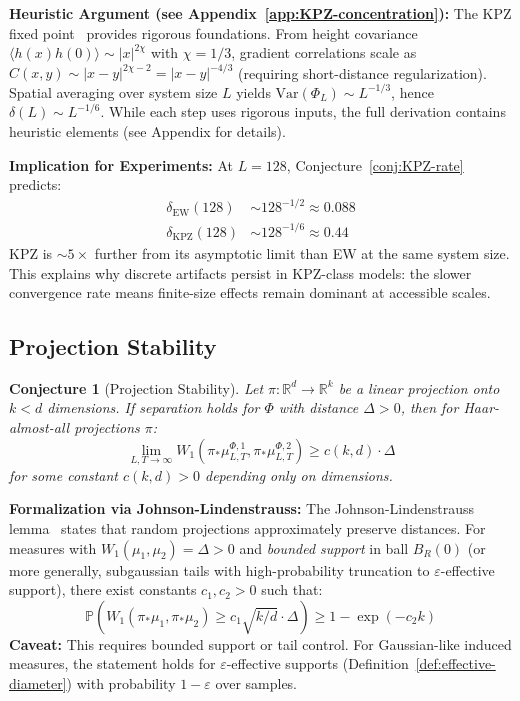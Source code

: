 \documentclass[aps,pre,reprint,amsmath,amssymb,superscriptaddress]{revtex4-2}
\newtheorem{conjecture}{Conjecture}
\newcommand{\EW}{\text{EW}}
\newcommand{\KPZ}{\text{KPZ}}
\newcommand{\bbP}{\mathbb{P}}
\newcommand{\bbR}{\mathbb{R}}
\begin{document}
\textbf{Heuristic Argument (see Appendix~\ref{app:KPZ-concentration}):} The KPZ fixed point~\cite{MQR2021} provides rigorous foundations. From height covariance $\langle h(x)h(0)\rangle \sim |x|^{2\chi}$ with $\chi=1/3$, gradient correlations scale as $C(x,y) \sim |x-y|^{2\chi-2} = |x-y|^{-4/3}$ (requiring short-distance regularization). Spatial averaging over system size $L$ yields $\text{Var}(\Phi_L) \sim L^{-1/3}$, hence $\delta(L) \sim L^{-1/6}$. While each step uses rigorous inputs, the full derivation contains heuristic elements (see Appendix for details).

\textbf{Implication for Experiments:} At $L = 128$, Conjecture~\ref{conj:KPZ-rate} predicts:
\begin{align}
\delta_{\EW}(128) &\sim 128^{-1/2} \approx 0.088 \\
\delta_{\KPZ}(128) &\sim 128^{-1/6} \approx 0.44
\end{align}
KPZ is $\sim 5\times$ further from its asymptotic limit than EW at the same system size. This explains why discrete artifacts persist in KPZ-class models: the slower convergence rate means finite-size effects remain dominant at accessible scales.

\subsection{Projection Stability}

\begin{conjecture}[Projection Stability]
\label{conj:projection}
Let $\pi: \bbR^d \to \bbR^k$ be a linear projection onto $k < d$ dimensions. If separation holds for $\Phi$ with distance $\Delta > 0$, then for Haar-almost-all projections $\pi$:
\begin{equation}
\lim_{L,T\to\infty} W_1(\pi_* \mu^{\Phi,1}_{L,T}, \pi_* \mu^{\Phi,2}_{L,T}) \geq c(k,d) \cdot \Delta
\end{equation}
for some constant $c(k,d) > 0$ depending only on dimensions.
\end{conjecture}

\textbf{Formalization via Johnson-Lindenstrauss:} The Johnson-Lindenstrauss lemma~\cite{JohnsonLindenstrauss1984} states that random projections approximately preserve distances. For measures with $W_1(\mu_1, \mu_2) = \Delta > 0$ and \emph{bounded support} in ball $B_R(0)$ (or more generally, subgaussian tails with high-probability truncation to $\varepsilon$-effective support), there exist constants $c_1, c_2 > 0$ such that:
\begin{equation}
\bbP\left(W_1(\pi_* \mu_1, \pi_* \mu_2) \geq c_1 \sqrt{k/d} \cdot \Delta\right) \geq 1 - \exp(-c_2 k)
\end{equation}
\textbf{Caveat:} This requires bounded support or tail control. For Gaussian-like induced measures, the statement holds for $\varepsilon$-effective supports (Definition~\ref{def:effective-diameter}) with probability $1-\varepsilon$ over samples.
\end{document}
